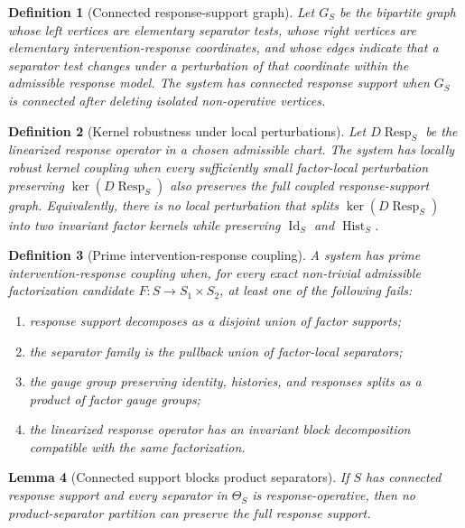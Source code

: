 \documentclass[11pt]{article}
\newtheorem{definition}{Definition}[section]
\newtheorem{lemma}[definition]{Lemma}
\newcommand{\Id}{\operatorname{Id}}
\newcommand{\Hist}{\operatorname{Hist}}
\newcommand{\Resp}{\operatorname{Resp}}
\begin{document}
\begin{definition}[Connected response-support graph]
Let $G_S$ be the bipartite graph whose left vertices are elementary separator tests, whose right vertices are elementary intervention-response coordinates, and whose edges indicate that a separator test changes under a perturbation of that coordinate within the admissible response model. The system has connected response support when $G_S$ is connected after deleting isolated non-operative vertices.
\end{definition}

\begin{definition}[Kernel robustness under local perturbations]
Let $D\Resp_S$ be the linearized response operator in a chosen admissible chart. The system has locally robust kernel coupling when every sufficiently small factor-local perturbation preserving $\ker(D\Resp_S)$ also preserves the full coupled response-support graph. Equivalently, there is no local perturbation that splits $\ker(D\Resp_S)$ into two invariant factor kernels while preserving $\Id_S$ and $\Hist_S$.
\end{definition}

\begin{definition}[Prime intervention-response coupling]
A system has prime intervention-response coupling when, for every exact non-trivial admissible factorization candidate $F:S\to S_1\times S_2$, at least one of the following fails:
\begin{enumerate}[label=(\roman*)]
  \item response support decomposes as a disjoint union of factor supports;
  \item the separator family is the pullback union of factor-local separators;
  \item the gauge group preserving identity, histories, and responses splits as a product of factor gauge groups;
  \item the linearized response operator has an invariant block decomposition compatible with the same factorization.
\end{enumerate}
\end{definition}

\begin{lemma}[Connected support blocks product separators]
If $S$ has connected response support and every separator in $\Theta_S$ is response-operative, then no product-separator partition can preserve the full response support.
\end{lemma}
\end{document}
